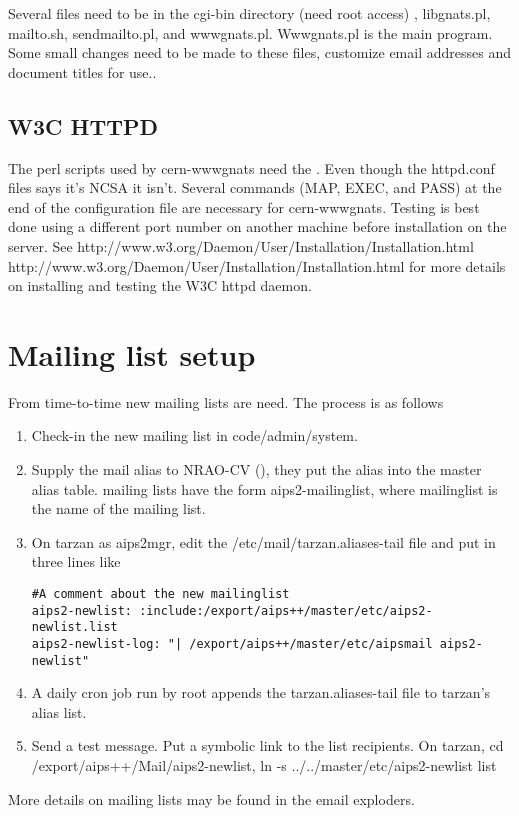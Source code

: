 Several files need to be in the cgi-bin directory (need root access) , libgnats.pl,
mailto.sh, sendmailto.pl, and wwwgnats.pl.  Wwwgnats.pl is the main program.
Some small changes need to be made to these files, customize email addresses
and document titles for  use..

\subsection{W3C HTTPD}
The perl scripts used by cern-wwwgnats need the
.  Even
though the httpd.conf files says it's NCSA it isn't. Several commands
(MAP, EXEC, and PASS) at the end of the configuration file are necessary for
cern-wwwgnats.
Testing is best done using a different port number
on another machine before installation on the \aips server.  
See \htmladdnormallink
{http://www.w3.org/Daemon/User/Installation/Installation.html}
{http://www.w3.org/Daemon/User/Installation/Installation.html} for more details
on installing and testing the W3C httpd daemon.
\section{Mailing list setup}
From time-to-time new mailing lists are need.  The process is as follows
\begin{enumerate}

\item Check-in the new mailing list in code/admin/system.
\item Supply the mail alias to NRAO-CV (), they put the alias into the master
alias table.  \aips
mailing lists have the form aips2-mailinglist, where mailinglist is the name
of the mailing list.
\item On tarzan as aips2mgr,
edit the /etc/mail/tarzan.aliases-tail file and put in three lines like
\begin{verbatim}
#A comment about the new mailinglist
aips2-newlist: :include:/export/aips++/master/etc/aips2-newlist.list
aips2-newlist-log: "| /export/aips++/master/etc/aipsmail aips2-newlist"
\end{verbatim}
\item A daily cron job run by root appends the tarzan.aliases-tail file to
tarzan's alias list.
\item Send a test message.  Put a symbolic link to the list recipients.
On tarzan, cd /export/aips++/Mail/aips2-newlist, ln -s ../../master/etc/aips2-newlist list
\end{enumerate}
More details on  mailing lists may be found in the
 {email exploders}.
